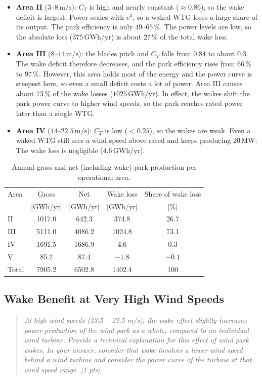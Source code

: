 \begin{itemize}
    \item \textbf{Area II} ($3$--$8\,\mathrm{m/s}$): $C_T$ is high and nearly constant ($\approx 0.86$), so the wake deficit is largest. Power scales with $v^3$, so a waked WTG loses a large share of its output. The park efficiency is only $49$--$65\,\%$. The power levels are low, so the absolute loss ($375\,\mathrm{GWh/yr}$) is about $27\,\%$ of the total wake loss.
    \item \textbf{Area III} ($8$--$14\,\mathrm{m/s}$): the blades pitch and $C_T$ falls from $0.84$ to about $0.3$. The wake deficit therefore decreases, and the park efficiency rises from $66\,\%$ to $97\,\%$. However, this area holds most of the energy and the power curve is steepest here, so even a small deficit costs a lot of power. Area III causes about $73\,\%$ of the wake losses ($1025\,\mathrm{GWh/yr}$). In effect, the wakes shift the park power curve to higher wind speeds, so the park reaches rated power later than a single WTG.
    \item \textbf{Area IV} ($14$--$22.5\,\mathrm{m/s}$): $C_T$ is low ($<0.25$), so the wakes are weak. Even a waked WTG still sees a wind speed above rated and keeps producing $20\,\mathrm{MW}$. The wake loss is negligible ($4.6\,\mathrm{GWh/yr}$).
\end{itemize}

\begin{table}[H]
    \centering
    \caption{Annual gross and net (including wake) park production per operational area.}
    \label{tab:elec-wakeareas}
    \begin{tabular}{lcccc}
        \hline
        Area & Gross & Net & Wake loss & Share of wake loss \\
        & [GWh/yr] & [GWh/yr] & [GWh/yr] & [\%] \\
        \hline
        II  & 1017.0 & 642.3  & 374.8  & 26.7 \\
        III & 5111.0 & 4086.2 & 1024.8 & 73.1 \\
        IV  & 1691.5 & 1686.9 & 4.6    & 0.3  \\
        V   & 85.7   & 87.4   & $-1.8$ & $-0.1$ \\
        \hline
        Total & 7905.2 & 6502.8 & 1402.4 & 100 \\
        \hline
    \end{tabular}
\end{table}

\subsection{Wake Benefit at Very High Wind Speeds}
\label{sec:elec-wake-high}
\begin{quote}
\emph{At high wind speeds (23.5 -- 27.5 m/s), the wake effect slightly increases power production of the wind park as a whole, compared to an individual wind turbine. Provide a technical explanation for this effect of wind park wakes. In your answer, consider that wake involves a lower wind speed behind a wind turbine and consider the power curve of the turbine at that wind speed range. [1 pts]}
\end{quote}

